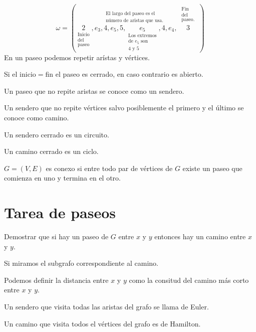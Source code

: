\documentclass[../main.tex]{subfiles}
\begin{document}
\[
	\omega =
	(
		\underset
		{
			\substack
			{
				\text{Inicio}\\
				\text{del}\\
				\text{paseo}
			}
		}
		{
			2
		}
		,
		\overset
		{
			\substack
			{
				\text{El largo del paseo es el}\\
				\text{número de aristas que usa.}
			}
		}
		{
			e_3
			,
			4
			,
			e_5
			,
			5
			,
			\underset
			{
				\substack
				{
					\text{Los extremos}\\
					\text{de $e_5$ son}\\
					\text{4 y 5}
				}
			}
			{
				e_5
			}
			,
			4
			,
			e_4
		}
		,
		\overset
		{
			\substack
			{
				\substack
				{
					\text{Fin}\\
					\text{del}\\
					\text{paseo.}
				}
			}
		}
		{
			3
		}
	)
\]
En un paseo podemos repetir arístas y vértices.

Si el inicio$=$fin el paseo es cerrado, en caso contrario es abierto.


Un paseo que no repite aristas se conoce como un sendero.

Un sendero que no repite vértices salvo posiblemente el primero y el último se
conoce como camino.

Un sendero cerrado es un circuito.

Un camino cerrado es un ciclo.

$G=(V,E)$ es conexo si entre todo par de vértices de $G$ existe un paseo que
comienza en uno y termina en el otro.

\section{Tarea de paseos}%
\label{sec:tarea_de_paseos}

Demostrar que si hay un paseo de $G$ entre $x$ y $y$ entonces hay un camino
entre $x$ y $y$.

Si miramos el subgrafo correspondiente al camino.

Podemos definir la distancia entre $x$ y $y$ como la consitud del camino más
corto entre $x$ y $y$.

Un sendero que visita todas las aristas del grafo se llama de Euler.

Un camino que visita todos el vértices del grafo es de Hamilton.
\end{document}
